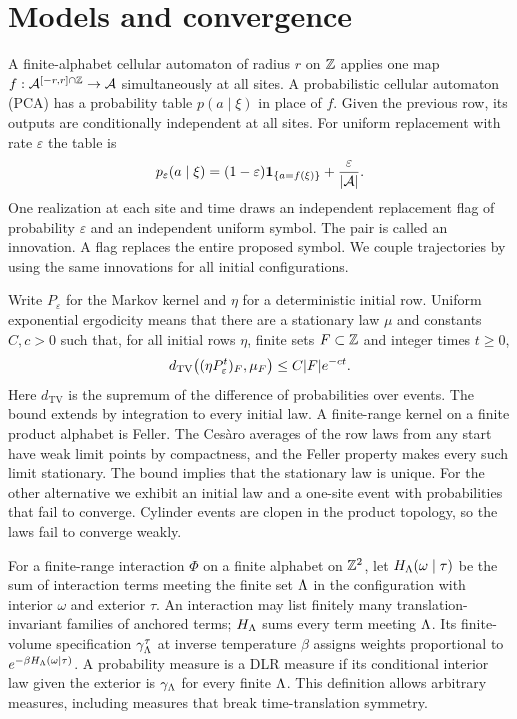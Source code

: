 \section{Models and convergence}\label{sec:model}

A finite-alphabet cellular automaton of radius \(r\) on \(\mathbb Z\) applies one map \(f:\mathcal A^{[-r,r]\cap\mathbb Z}\to\mathcal A\) simultaneously at all sites. A probabilistic cellular automaton (PCA) has a probability table \(p(a\mid\xi)\) in place of \(f\). Given the previous row, its outputs are conditionally independent at all sites. For uniform replacement with rate \(\varepsilon\) the table is
\begin{equation}\label{eq:replacement}
p_\varepsilon(a\mid\xi)
=(1-\varepsilon)\mathbf 1_{\{a=f(\xi)\}}+\frac{\varepsilon}{|\mathcal A|}.
\end{equation}
One realization at each site and time draws an independent replacement flag of probability \(\varepsilon\) and an independent uniform symbol. The pair is called an innovation. A flag replaces the entire proposed symbol. We couple trajectories by using the same innovations for all initial configurations.

Write \(P_\varepsilon\) for the Markov kernel and \(\eta\) for a deterministic initial row. Uniform exponential ergodicity means that there are a stationary law \(\mu\) and constants \(C,c>0\) such that, for all initial rows \(\eta\), finite sets \(F\subset\mathbb Z\) and integer times \(t\ge0\),
\begin{equation}\label{eq:uee}
d_{\mathrm{TV}}\bigl((\eta P_\varepsilon^t)_F,\mu_F\bigr)
\le C|F|e^{-ct}.
\end{equation}
Here \(d_{\mathrm{TV}}\) is the supremum of the difference of probabilities over events. The bound extends by integration to every initial law. A finite-range kernel on a finite product alphabet is Feller. The Ces\`aro averages of the row laws from any start have weak limit points by compactness, and the Feller property makes every such limit stationary. The bound implies that the stationary law is unique. For the other alternative we exhibit an initial law and a one-site event with probabilities that fail to converge. Cylinder events are clopen in the product topology, so the laws fail to converge weakly.

For a finite-range interaction \(\Phi\) on a finite alphabet on \(\mathbb Z^2\), let \(H_\Lambda(\omega\mid\tau)\) be the sum of interaction terms meeting the finite set \(\Lambda\) in the configuration with interior \(\omega\) and exterior \(\tau\). An interaction may list finitely many translation-invariant families of anchored terms; \(H_\Lambda\) sums every term meeting \(\Lambda\). Its finite-volume specification \(\gamma^\tau_\Lambda\) at inverse temperature \(\beta\) assigns weights proportional to \(e^{-\beta H_\Lambda(\omega\mid\tau)}\). A probability measure is a DLR measure if its conditional interior law given the exterior is \(\gamma_\Lambda\) for every finite \(\Lambda\). This definition allows arbitrary measures, including measures that break time-translation symmetry.

